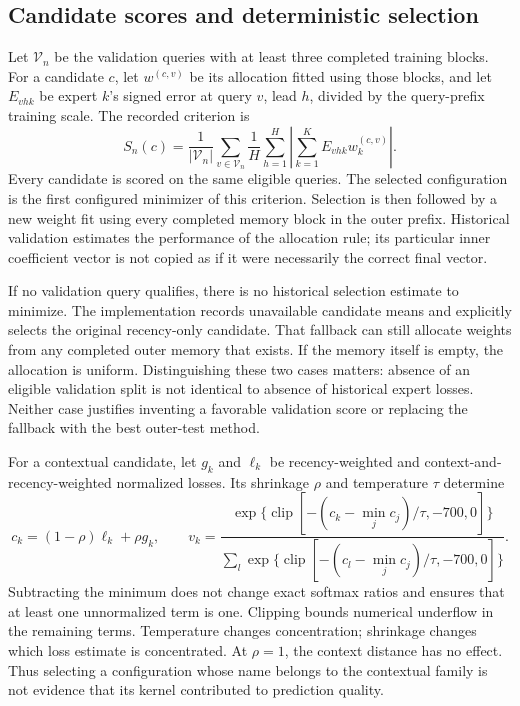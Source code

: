 \subsection{Candidate scores and deterministic selection}
Let $\mathcal V_n$ be the validation queries with at least three completed training blocks. For a candidate $c$, let $w^{(c,v)}$ be its allocation fitted using those blocks, and let $E_{vhk}$ be expert $k$'s signed error at query $v$, lead $h$, divided by the query-prefix training scale. The recorded criterion is
\begin{equation}\label{eq:nested-score}
S_n(c)=\frac{1}{|\mathcal V_n|}\sum_{v\in\mathcal V_n}
\frac{1}{H}\sum_{h=1}^{H}\left|\sum_{k=1}^{K}E_{vhk}w^{(c,v)}_k\right|.
\end{equation}
Every candidate is scored on the same eligible queries. The selected configuration is the first configured minimizer of this criterion. Selection is then followed by a new weight fit using every completed memory block in the outer prefix. Historical validation estimates the performance of the allocation rule; its particular inner coefficient vector is not copied as if it were necessarily the correct final vector.

If no validation query qualifies, there is no historical selection estimate to minimize. The implementation records unavailable candidate means and explicitly selects the original recency-only candidate. That fallback can still allocate weights from any completed outer memory that exists. If the memory itself is empty, the allocation is uniform. Distinguishing these two cases matters: absence of an eligible validation split is not identical to absence of historical expert losses. Neither case justifies inventing a favorable validation score or replacing the fallback with the best outer-test method.

For a contextual candidate, let $g_k$ and $\ell_k$ be recency-weighted and context-and-recency-weighted normalized losses. Its shrinkage $\rho$ and temperature $\tau$ determine
\begin{equation}\label{eq:candidate-competence}
c_k=(1-\rho)\ell_k+\rho g_k,\qquad
v_k=\frac{\exp\{\operatorname{clip}[-(c_k-\min_jc_j)/\tau,-700,0]\}}
{\sum_l\exp\{\operatorname{clip}[-(c_l-\min_jc_j)/\tau,-700,0]\}}.
\end{equation}
Subtracting the minimum does not change exact softmax ratios and ensures that at least one unnormalized term is one. Clipping bounds numerical underflow in the remaining terms. Temperature changes concentration; shrinkage changes which loss estimate is concentrated. At $\rho=1$, the context distance has no effect. Thus selecting a configuration whose name belongs to the contextual family is not evidence that its kernel contributed to prediction quality.

